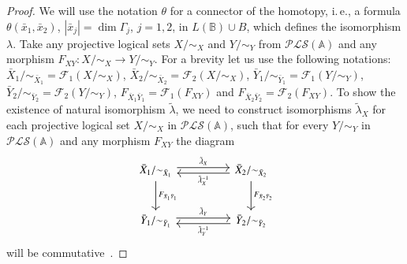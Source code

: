 \documentclass[12pt]{article}
\theoremstyle{definition}
\def\MA{{\mathbb{A}}}
\def\MB{{\mathbb{B}}}
\def\F{{\mathcal{F}}}
\def\PLS{{\mathcal{PLS}}}
\begin{document}
\begin{proof}
We will use the notation $\theta$ for a connector of the homotopy, i.\,e., a formula $\theta(\bar x_1,\bar x_2)$, $|\bar x_j|=\dim\Gamma_j$, $j=1,2$, in $L(\MB)\cup B$, which defines the isomorphism $\lambda$. 
Take any projective logical sets $X/{\sim_X}$ and $Y/{\sim_Y}$ from $\PLS(\MA)$ and any morphism $F_{XY}\colon X/{\sim_X} \to Y/{\sim_Y}$. For a brevity let us use the following notations: $\bar X_1/{\sim_{\bar X_1}}=\F_1(X/{\sim_X})$, $\bar X_2/{\sim_{\bar X_2}}=\F_2(X/{\sim_X})$, $\bar Y_1/{\sim_{\bar Y_1}}=\F_1(Y/{\sim_Y})$, $\bar Y_2/{\sim_{\bar Y_2}}=\F_2(Y/{\sim_Y})$, $F_{\bar X_1 \bar Y_1}=\F_1(F_{XY})$ and $F_{\bar X_2 \bar Y_2}=\F_2(F_{XY})$. 
To show the existence of natural isomorphism $\tilde\lambda$, we need to construct isomorphisms $\tilde\lambda_X$ for each projective logical set $X/{\sim_X}$ in $\PLS(\MA)$, such that for every $Y/{\sim_Y}$ in $\PLS(\MA)$ and any morphism $F_{XY}$ the diagram
\begin{equation}\label{eq:tau}
\begin{tikzcd}[column sep=huge, row sep=large]
\bar X_1/{\sim_{\bar X_1}} 
\arrow[r,leftarrow,shift right,"\tilde\lambda_X^{-1}"']
\arrow[r,rightarrow,shift left,swap,"\tilde\lambda_X"'] 
\arrow{d}{F_{\bar X_1 \bar Y_1}} 
& \bar X_2/{\sim_{\bar X_2}}
\arrow{d}{F_{\bar X_2 \bar Y_2}}\\
\bar Y_1/{\sim_{\bar Y_1}}
\arrow[r,leftarrow,shift right,"\tilde\lambda_Y^{-1}"']
\arrow[r,rightarrow,shift left,swap,"\tilde\lambda_Y"']  
& \bar Y_2/{\sim_{\bar Y_2}} 
\end{tikzcd}    
\end{equation}
will be commutative~\cite[Section~1.4]{MacLane}. 


\end{proof}
\end{document}
